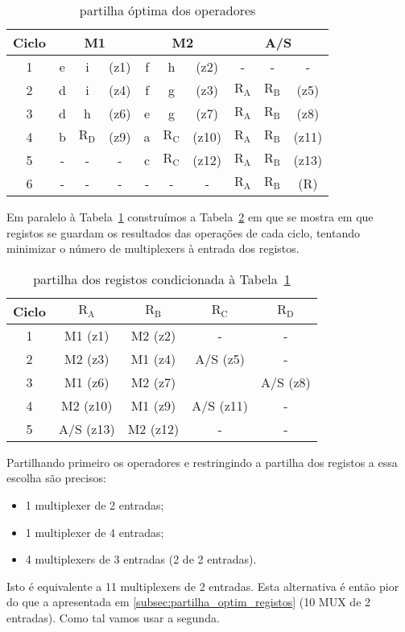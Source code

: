 \documentclass[a4paper]{article}
\begin{document}
\begin{table}[H]
\centering
\begin{tabular}{|c||ccc|ccc|ccc|}
\hline 
Ciclo & \multicolumn{3}{c|}{M1} & \multicolumn{3}{c|}{M2} & \multicolumn{3}{c|}{A/S} \\ 
\hline 
\hline 
1 & e & i & (z1) & f & h & (z2) & - & - & - \\ 
\hline 
2 & d & i & (z4) & f & g & (z3) & $\mathrm{R_A}$ & $\mathrm{R_B}$ & (z5) \\
\hline 
3 & d & h & (z6) & e & g & (z7) & $\mathrm{R_A}$ & $\mathrm{R_B}$ & (z8) \\ 
\hline 
4 & b & $\mathrm{R_D}$ & (z9) & a & $\mathrm{R_C}$ & (z10) & $\mathrm{R_A}$ & $\mathrm{R_B}$ & (z11) \\ 
\hline 
5 & - & - & - & c & $\mathrm{R_C}$ & (z12) & $\mathrm{R_A}$ & $\mathrm{R_B}$ & (z13) \\ 
\hline 
6 & - & - & - & - & - & - & $\mathrm{R_A}$ & $\mathrm{R_B}$ & (R) \\ 
\hline 
\end{tabular} 
\caption{partilha óptima dos operadores}
\label{tab:binding_optim_oper}
\end{table}

Em paralelo à Tabela~\ref{tab:binding_optim_oper} construímos a Tabela~\ref{tab:binding_reg} em que se mostra em que registos se guardam os resultados das operações de cada ciclo, tentando minimizar o número de multiplexers à entrada dos registos.

\begin{table}[H]
\centering
\begin{tabular}{|c||c|c|c|c|}
\hline 
Ciclo & $\mathrm{R_A}$ & $\mathrm{R_B}$ & $\mathrm{R_C}$ & $\mathrm{R_D}$ \\ 
\hline 
\hline
1 & M1 (z1) & M2 (z2) & - & - \\ 
\hline 
2 & M2 (z3) & M1 (z4) & A/S (z5) & - \\ 
\cline{1-3}\cline{5-5}
3 & M1 (z6) & M2 (z7) &  & A/S (z8) \\ 
\hline 
4 & M2 (z10) & M1 (z9) & A/S (z11) & - \\ 
\hline 
5 & A/S (z13) & M2 (z12) & - & - \\ 
\hline 
\end{tabular}
\caption{partilha dos registos condicionada à Tabela~\ref{tab:binding_optim_oper}}
\label{tab:binding_reg}
\end{table}

Partilhando primeiro os operadores e restringindo a partilha dos registos a essa escolha são precisos:
\begin{itemize}
\item 1 multiplexer de 2 entradas;
\item 1 multiplexer de 4 entradas;
\item 4 multiplexers de 3 entradas (2 de 2 entradas).
\end{itemize}
Isto é equivalente a 11 multiplexers de 2 entradas. Esta alternativa é então pior do que a apresentada em \ref{subsec:partilha_optim_registos} (10 MUX de 2 entradas). Como tal vamos usar a segunda.
\end{document}
